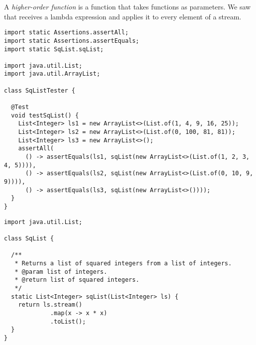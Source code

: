 A \textit{higher-order function} is a function that takes functions as parameters. We saw that  receives a lambda expression and applies it to every element of a stream. 


\begin{cl}[]{}
\begin{lstlisting}[language=MyJava]
import static Assertions.assertAll;
import static Assertions.assertEquals;
import static SqList.sqList;

import java.util.List;
import java.util.ArrayList;

class SqListTester {

  @Test
  void testSqList() {
    List<Integer> ls1 = new ArrayList<>(List.of(1, 4, 9, 16, 25));
    List<Integer> ls2 = new ArrayList<>(List.of(0, 100, 81, 81));
    List<Integer> ls3 = new ArrayList<>();
    assertAll(
      () -> assertEquals(ls1, sqList(new ArrayList<>(List.of(1, 2, 3, 4, 5)))),
      () -> assertEquals(ls2, sqList(new ArrayList<>(List.of(0, 10, 9, 9)))),
      () -> assertEquals(ls3, sqList(new ArrayList<>())));
  }
}
\end{lstlisting}    
\end{cl}

\begin{cl}[]{}
\begin{lstlisting}[language=MyJava]
import java.util.List;

class SqList {

  /**
   * Returns a list of squared integers from a list of integers.
   * @param list of integers.
   * @return list of squared integers.
   */
  static List<Integer> sqList(List<Integer> ls) {
    return ls.stream()
             .map(x -> x * x)
             .toList();
  }
}
\end{lstlisting}    
\end{cl}


